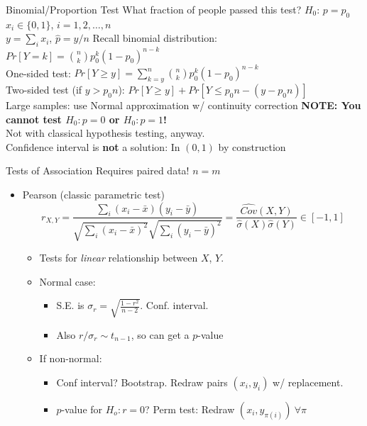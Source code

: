 \begin{frame}{Binomial/Proportion Test}
What fraction of people passed this test? $H_0$: $p=p_0$\\
$x_i \in \{0,1\}$, $i=1,2,\ldots,n$\\
$y=\sum_i x_i$, $\hat{p}=y/n$
\br
Recall binomial distribution: $Pr[Y=k] = {n \choose k} p_0^k (1-p_0)^{n-k}$\\
One-sided test: $Pr[Y\geq y] = \sum_{k=y}^n {n \choose k} p_0^k (1-p_0)^{n-k}$\\
Two-sided test (if $y>p_0n$): $Pr[Y\geq y] + Pr[Y\leq p_0n-(y-p_0n)]$\\
\br
Large samples: use Normal approximation w/ continuity correction
\br
\textbf{NOTE: You cannot test $H_0:p=0$ or $H_0:p=1$!}\\
Not with classical hypothesis testing, anyway.\\
Confidence interval is \textbf{not} a solution: In $(0,1)$ by construction
\end{frame}

\begin{frame}{Tests of Association}
Requires paired data! $n=m$
    \begin{itemize}
        \item Pearson (classic parametric test)
        $$
        r_{X,Y} = \frac{\sum_i (x_i-\bar{x})(y_i-\bar{y})}{\sqrt{\sum_i (x_i-\bar{x})^2} \sqrt{\sum_i(y_i-\bar{y})^2}} = \frac{\hat{Cov}(X,Y)}{\hat{\sigma}(X)\hat{\sigma}(Y)} \in [-1,1]
        $$
        \begin{itemize}
            \item Tests for \textit{linear} relationship between $X$, $Y$.
            \item Normal case:
            \begin{itemize}
                \item S.E. is $\sigma_r=\sqrt{\frac{1-r^2}{n-2}}$. Conf. interval.
                \item Also $r/\sigma_r \sim t_{n-1}$, so can get a $p$-value
            \end{itemize}
            \item If non-normal:
            \begin{itemize}
                \item Conf interval? Bootstrap. Redraw pairs $(x_i,y_i)$ w/ replacement.
                \item $p$-value for $H_o:r=0$? Perm test: Redraw $(x_i,y_{\pi(i)})\ \forall \pi$
            \end{itemize}
        \end{itemize}
    \end{itemize}
\end{frame}

